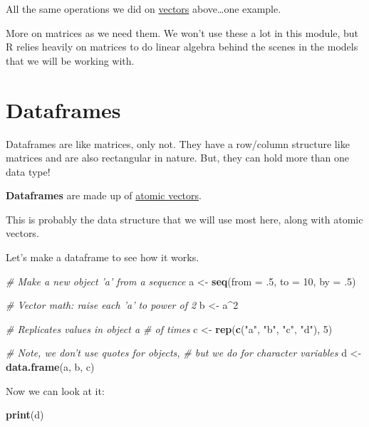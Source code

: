 \documentclass[
]{book}
\newenvironment{Shaded}{\begin{snugshade}}{\end{snugshade}}
\newcommand{\CommentTok}[1]{\textcolor[rgb]{0.56,0.35,0.01}{\textit{#1}}}
\newcommand{\DataTypeTok}[1]{\textcolor[rgb]{0.13,0.29,0.53}{#1}}
\newcommand{\DecValTok}[1]{\textcolor[rgb]{0.00,0.00,0.81}{#1}}
\newcommand{\FloatTok}[1]{\textcolor[rgb]{0.00,0.00,0.81}{#1}}
\newcommand{\KeywordTok}[1]{\textcolor[rgb]{0.13,0.29,0.53}{\textbf{#1}}}
\newcommand{\NormalTok}[1]{#1}
\newcommand{\OperatorTok}[1]{\textcolor[rgb]{0.81,0.36,0.00}{\textbf{#1}}}
\newcommand{\StringTok}[1]{\textcolor[rgb]{0.31,0.60,0.02}{#1}}
\begin{document}
All the same operations we did on \protect\hyperlink{operations}{vectors} above\ldots one example.

More on matrices as we need them. We won't use these a lot in this module, but R relies heavily on matrices to do linear algebra behind the scenes in the models that we will be working with.

\hypertarget{dataframes}{%
\section{Dataframes}\label{dataframes}}

Dataframes are like matrices, only not. They have a row/column structure like matrices and are also rectangular in nature. But, they can hold more than one data type!

\textbf{Dataframes} are made up of \protect\hyperlink{atomics}{atomic vectors}.

This is probably the data structure that we will use most here, along with atomic vectors.

Let's make a dataframe to see how it works.

\begin{Shaded}
\begin{Highlighting}[]
\CommentTok{# Make a new object 'a' from a sequence}
\NormalTok{a <-}\StringTok{ }\KeywordTok{seq}\NormalTok{(}\DataTypeTok{from =} \FloatTok{.5}\NormalTok{, }\DataTypeTok{to =} \DecValTok{10}\NormalTok{, }\DataTypeTok{by =} \FloatTok{.5}\NormalTok{)}

\CommentTok{# Vector math: raise each 'a' to power of 2}
\NormalTok{b <-}\StringTok{ }\NormalTok{a}\OperatorTok{^}\DecValTok{2}

\CommentTok{# Replicates values in object a # of times}
\NormalTok{c <-}\StringTok{ }\KeywordTok{rep}\NormalTok{(}\KeywordTok{c}\NormalTok{(}\StringTok{"a"}\NormalTok{, }\StringTok{"b"}\NormalTok{, }\StringTok{"c"}\NormalTok{, }\StringTok{"d"}\NormalTok{), }\DecValTok{5}\NormalTok{)}

\CommentTok{# Note, we don't use quotes for objects,}
\CommentTok{# but we do for character variables}
\NormalTok{d <-}\StringTok{ }\KeywordTok{data.frame}\NormalTok{(a, b, c)}
\end{Highlighting}
\end{Shaded}

Now we can look at it:

\begin{Shaded}
\begin{Highlighting}[]
\KeywordTok{print}\NormalTok{(d)}
\end{Highlighting}
\end{Shaded}
\end{document}
